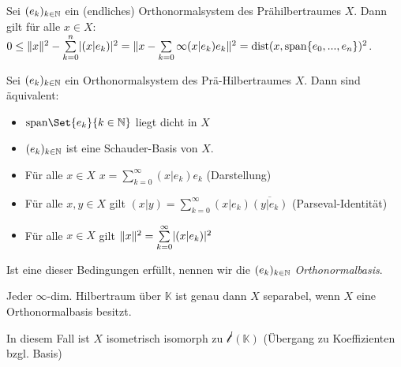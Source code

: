 \documentclass{cheat-sheet}
\newcommand{\K}{\mathbb{K}}
\newcommand{\dist}{\mathrm{dist}} %
\begin{document}
\begin{lem}
  Sei $(e_k)_{k \in \mathbb{N}}$ ein (endliches) Orthonormalsystem des Prähilbertraumes $X$. Dann gilt für alle $x \in X$: $0 \leq \|x\|^2 - \sum_{k=0}^n \abs{(x|e_k)}^2 = \| x - \sum_{k=0}\infty (x | e_k) e_k \|^2 = \dist(x, \mathrm{span} \{ e_0, ..., e_n \})^2$.
\end{lem}

\begin{satz}
  Sei $(e_k)_{k \in \mathbb{N}}$ ein Orthonormalsystem des Prä-Hilbertraumes $X$. Dann sind äquivalent:
  \begin{itemize}
    \item $\mathrm{span} \Set{ e_k }{ k \in \N }$ liegt dicht in $X$
    \item $(e_k)_{k \in \mathbb{N}}$ ist eine Schauder-Basis von $X$.
    \item Für alle $x \in X$ $x = \sum_{k=0}^\infty (x | e_k) e_k$ (Darstellung)
    \item Für alle $x, y \in X$ gilt $(x|y) = \sum_{k=0}^\infty (x|e_k) \overline{(y|e_k)}$ (Parseval-Identität)
    \item Für alle $x \in X$ gilt $\| x \|^2 = \sum_{k=0}^\infty \abs{(x|e_k)}^2$
  \end{itemize}
\end{satz}

\begin{defn}
  Ist eine dieser Bedingungen erfüllt, nennen wir die $(e_k)_{k \in \mathbb{N}}$ \emph{Orthonormalbasis}.
\end{defn}

\begin{satz}
  Jeder $\infty$-dim. Hilbertraum über $\K$ ist genau dann $X$ separabel, wenn $X$ eine Orthonormalbasis besitzt.
\end{satz}

\begin{bem}
  In diesem Fall ist $X$ isometrisch isomorph zu $\mathcal{l}^l(\K)$ (Übergang zu Koeffizienten bzgl. Basis)
\end{bem}
\end{document}
